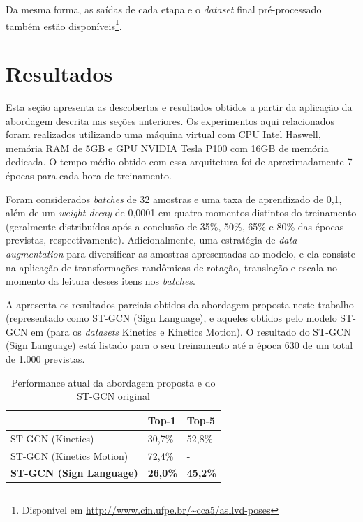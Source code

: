 Da mesma forma, as saídas de cada etapa e o \textit{dataset} final pré-processado também estão disponíveis\footnote{
    Disponível em \url{http://www.cin.ufpe.br/~cca5/asllvd-poses}
}.


\section{Resultados} %
\label{sec:resultados}

Esta seção apresenta as descobertas e resultados obtidos a partir da aplicação da abordagem descrita nas seções anteriores. Os experimentos aqui relacionados foram realizados utilizando uma máquina virtual com CPU Intel Haswell, memória RAM de 5GB e GPU NVIDIA Tesla P100 com 16GB de memória dedicada. O tempo médio obtido com essa arquitetura foi de aproximadamente 7 épocas para cada hora de treinamento.

Foram considerados \textit{batches} de 32 amostras e uma taxa de aprendizado de 0,1, além de um \textit{weight decay} de 0,0001 em quatro momentos distintos do treinamento (geralmente distribuídos após a conclusão de 35\%, 50\%, 65\% e 80\% das épocas previstas, respectivamente). 
Adicionalmente, uma estratégia de \textit{data augmentation} para diversificar as amostras apresentadas ao modelo, e ela consiste na aplicação de transformações randômicas de rotação, translação e escala no momento da leitura desses itens nos \textit{batches}.

A  apresenta os resultados parciais obtidos da abordagem proposta neste trabalho (representado como ST-GCN (Sign Language), e aqueles obtidos pelo modelo ST-GCN em \cite{st-gcn-2018} (para os \textit{datasets} Kinetics e Kinetics Motion). O resultado do ST-GCN (Sign Language) está listado para o seu treinamento até a época 630 de um total de 1.000 previstas.

\begin{table}[ht]
    \centering
    \caption{Performance atual da abordagem proposta e do ST-GCN original}
    \label{tab:resultados-1}
    \begin{tabular}{@{}lll@{}} \toprule
                                        &   Top-1           &   Top-5           \\ \midrule
        ST-GCN (Kinetics)               &   30,7\%          &   52,8\%          \\
        ST-GCN (Kinetics Motion)        &   72,4\%          &   -               \\ \midrule
        \textbf{ST-GCN (Sign Language)} & \textbf{26,0\%}   &   \textbf{45,2\%} \\ \bottomrule
    \end{tabular}
\end{table}

